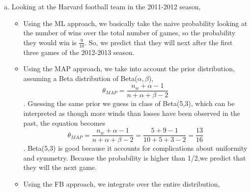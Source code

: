 \documentclass[11pt]{article}
\begin{document}
\begin{enumerate}[a.]
\item Looking at the Harvard football team in the 2011-2012 season,
	\begin{itemize}
	\item Using the ML approach, we basically take the naive probability looking at the number of wins over the total number of games, so the probability they would win is $\frac{9}{10}$. So, we predict that they will  next after the first three games of the 2012-2013 season.
	\item Using the MAP approach, we take into account the prior distribution, assuming a Beta distribution of Beta($\alpha,\beta$), \[\theta_{MAP} = \frac{n_w+\alpha-1}{n+\alpha+\beta-2}\]. Guessing the same prior we guess in class of Beta(5,3), which can be interpreted as though more winds than losses have been observed in the past, the equation becomes
	\[\theta_{MAP} = \frac{n_w+\alpha-1}{n+\alpha+\beta-2}=\frac{5+9-1}{10+5+3-2}=\frac{13}{16}\]. Beta(5,3) is good because it accounts for complications about uniformity and symmetry. Because the probability is higher than 1/2,we predict that they will  the next game.
	\item Using the FB approach, we integrate over the entire distribution, 
	\end{itemize}
\end{enumerate}
\end{document}
